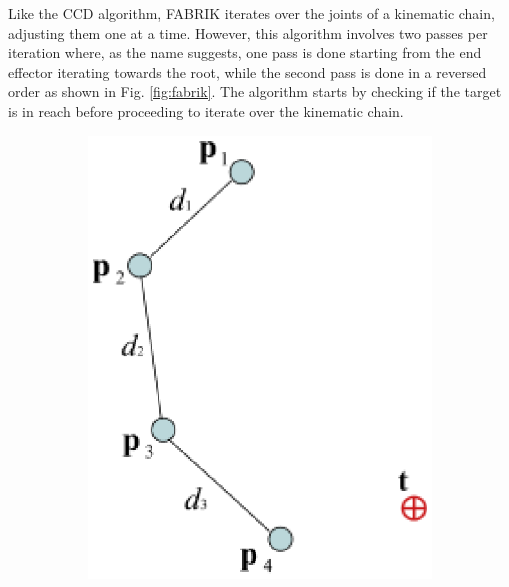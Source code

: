 Like the CCD algorithm, FABRIK iterates over the joints of a kinematic chain,
adjusting them one at a time. However, this algorithm involves two passes per
iteration where, as the name suggests, one pass is done starting from the end
effector iterating towards the root, while the second pass is done in a reversed
order as shown in Fig. \ref{fig:fabrik}. The algorithm starts by checking if the
target is in reach before proceeding to iterate over the kinematic chain. 

\begin{figure}
    \centering
    \captionsetup{justification=centering}
    \begin{subfigure}{0.2\textwidth}
        \centering
        \includegraphics[width=\linewidth]{grafika/fabrik_iteration1.eps}
        \subcaption{}
        \label{fig:fabrik1}
    \end{subfigure}
    \begin{subfigure}{0.2\textwidth}
        \centering

\end{subfigure}
\end{figure}
